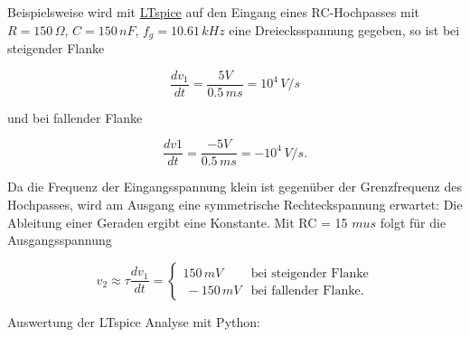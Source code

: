 \documentclass[
  ngerman,
  letterpaper,
]{scrbook}
\begin{document}
Beispielsweise wird mit
\href{https://github.com/mimeiners/gel2/raw/refs/heads/quarto/files/spice/bsp134_reisch.asc}{LTspice}
auf den Eingang eines RC-Hochpasses mit \(R = 150\,\Omega\),
\(C = 150\, nF\), \(f_g = 10.61\,kHz\) eine Dreiecksspannung gegeben, so
ist bei steigender Flanke

\[
\frac{dv_1}{dt} = \frac{5V}{0.5\,ms} = 10^4\,V/s
\]

und bei fallender Flanke

\[
\frac{dv1}{dt}  = \frac{−5V}{0.5\,ms} = −10^4\,V/s.
\]

Da die Frequenz der Eingangsspannung klein ist gegenüber der
Grenzfrequenz des Hochpasses, wird am Ausgang eine symmetrische
Rechteckspannung erwartet: Die Ableitung einer Geraden ergibt eine
Konstante. Mit RC = 15 \(mu s\) folgt für die Ausgangsspannung

\[
v_2 \approx \tau \frac{dv_1}{dt} =
\begin{cases}
150\,mV & \text{bei steigender Flanke} \\\
−150 \,mV & \text{bei fallender Flanke.}
\end{cases}
\]

Auswertung der LTspice Analyse mit Python:
\end{document}
